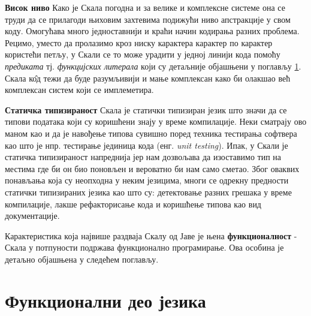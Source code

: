 \documentclass[12pt,oneside]{memoir}
\begin{document}
\begin{description}
\item \textbf{Висок ниво} Како је Скала погодна и за велике и комплексне системе она се труди да се прилагоди њиховим захтевима подижући ниво апстракције у свом коду. Омогућава много једноставнији и краћи начин кодирања разних проблема. Рецимо, уместо да пролазимо кроз ниску карактера карактер по карактер користећи петљу, у Скали се то може урадити у једној линији кода помоћу \textit{предиката} тј.  \textit{функцијских литерала} који су детаљније објашњени у поглављу \ref{sec:funkDeoJezika}. Скала к\^{о}д тежи да буде разумљивији и мање комплексан како би олакшао већ комплексан систем који се имплеметира.

\item \textbf{Статичка типизираност} Скала је статички типизиран језик што значи да се типови података који су коришћени знају у време компилације. Неки сматрају ово маном као и да је навођење типова сувишно поред техника тестирања софтвера као што је нпр. тестирање јединица кода (енг. \textit{unit testing}). Ипак, у Скали је статичка типизираност напреднија јер нам дозвољава да изоставимо тип на местима где би он био поновљен и вероватно би нам само сметао. Због оваквих понављања која су неопходна у неким језицима, многи се одрекну предности статички типизираних језика као што су: детектовање разних грешака у време компилације, лакше рефакторисање кода и коришћење типова као вид документације.
\end{description}
\par Карактеристика која највише раздваја Скалу од Јаве је њена \textbf{функционалност} - Скала у потпуности подржава функционално програмирање. Ова особина је детаљно објашњена у следећем поглављу.


\section{Функционални део језика}
\label{sec:funkDeoJezika}
\end{document}
